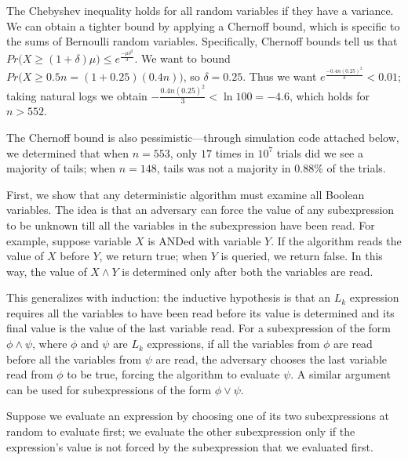 The Chebyshev inequality holds for all random variables if they have a variance. We can obtain
a tighter bound by applying a Chernoff bound, which is specific to the sums of Bernoulli random variables.
Specifically, Chernoff bounds tell us that $Pr\big(X \geq (1+\delta)\mu \big) \leq e^{\frac{-\mu\delta^2}{3}}$.
We want to bound $Pr\big(X \geq 0.5n = (1+0.25)(0.4n)\big)$, so
$\delta = 0.25$. Thus we want
$e^{\frac{-0.4n (0.25)^2}{3}} < 0.01$; taking natural logs we obtain $-\frac{0.4n (0.25)^2}{3} < \ln{100} = -4.6$, which holds for $n > 552$.

The Chernoff bound is also pessimistic---through simulation code attached below,
we determined that when $n=553$, only $17$ times in $10^7$ trials did we
see a majority of tails; when $n=148$, tails was not a majority in $0.88$\% 
of the trials. 



First, we show that any deterministic algorithm must examine all
Boolean variables. 
The idea is that an adversary can force the value of any subexpression
to be unknown till all the variables in the subexpression have been read.
For example, suppose variable $X$ is ANDed with variable $Y$.
If the algorithm reads the value of $X$ before $Y$,
we return true; when $Y$ is queried, we return false.
In this way, the value of $X\wedge Y$ is determined
only after both the variables are read. 

This generalizes with induction: the inductive hypothesis is that
an $L_k$ expression requires all the variables to have been read
before its value is determined and its final value is the 
value of the last variable read.
For a subexpression of the form $\phi \wedge \psi$, where $\phi$ and
$\psi$ are $L_k$ expressions, if all the variables from $\phi$
are read before all the variables from $\psi$ are read, the adversary
chooses the last variable read from $\phi$ to be true, forcing
the algorithm to evaluate $\psi$. A similar argument can be used
for subexpressions of the form $\phi \vee \psi$.

Suppose we evaluate an expression by choosing 
one of its two subexpressions at random to evaluate first;
we evaluate the other subexpression only if the expression's value
is not forced by the subexpression that we evaluated first.

